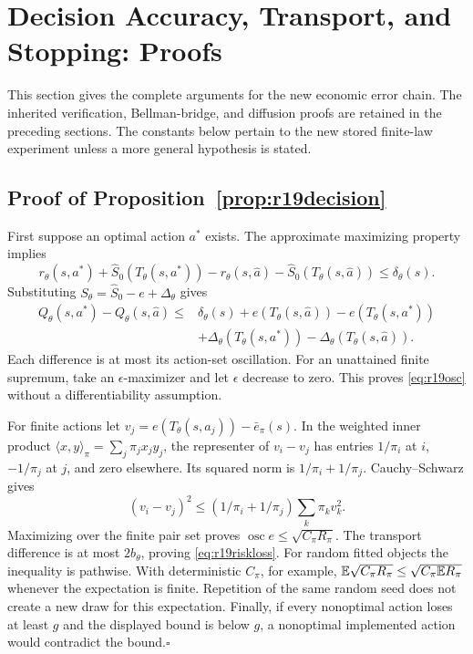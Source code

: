 \section{Decision Accuracy, Transport, and Stopping: Proofs}\label{app:r19proofs}
This section gives the complete arguments for the new economic error chain.
The inherited verification, Bellman-bridge, and diffusion proofs are retained
in the preceding sections. The constants below pertain to the new stored
finite-law experiment unless a more general hypothesis is stated.

\subsection{Proof of Proposition~\ref{prop:r19decision}}
First suppose an optimal action $a^*$ exists. The approximate maximizing
property implies
\[
 r_\theta(s,a^*)+\widehat S_0(T_\theta(s,a^*))
 -r_\theta(s,\widehat a)-\widehat S_0(T_\theta(s,\widehat a))
 \leq\delta_\theta(s).
\]
Substituting $S_\theta=\widehat S_0-e+\Delta_\theta$ gives
\begin{align*}
 Q_\theta(s,a^*)-Q_\theta(s,\widehat a)
 \leq {}&\delta_\theta(s)
       +e(T_\theta(s,\widehat a))-e(T_\theta(s,a^*))\\
       &+\Delta_\theta(T_\theta(s,a^*))
                -\Delta_\theta(T_\theta(s,\widehat a)).
\end{align*}
Each difference is at most its action-set oscillation. For an unattained
finite supremum, take an $\epsilon$-maximizer and let $\epsilon$ decrease
to zero. This proves \eqref{eq:r19osc} without a differentiability assumption.

For finite actions let $v_j=e(T_\theta(s,a_j))-\bar e_\pi(s)$.
In the weighted inner product $\langle x,y\rangle_\pi=\sum_j\pi_jx_jy_j$,
the representer of $v_i-v_j$ has entries $1/\pi_i$ at $i$, $-1/\pi_j$
at $j$, and zero elsewhere. Its squared norm is $1/\pi_i+1/\pi_j$.
Cauchy--Schwarz gives
\[
 (v_i-v_j)^2\leq(1/\pi_i+1/\pi_j)\sum_k\pi_kv_k^2.
\]
Maximizing over the finite pair set proves
$\operatorname{osc}e\leq\sqrt{C_\pi R_\pi}$. The transport difference is
at most $2b_\theta$, proving \eqref{eq:r19riskloss}. For random fitted
objects the inequality is pathwise. With deterministic $C_\pi$, for example,
$\mathbb E\sqrt{C_\pi R_\pi}\leq\sqrt{C_\pi\mathbb E R_\pi}$ whenever the expectation
is finite. Repetition of the same random seed does not create a new draw
for this expectation. Finally, if every nonoptimal action loses at least
$g$ and the displayed bound is below $g$, a nonoptimal implemented action
would contradict the bound.\hfill$\square$

